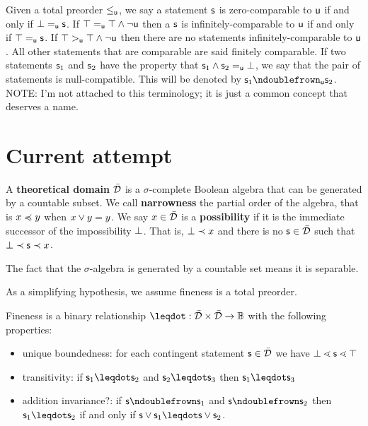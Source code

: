\documentclass{article}
\begin{document}
Given a total preorder $\leq_{\stmt[u]}$, we say a statement $\stmt$ is zero-comparable to $\stmt[u]$ if and only if $\impossibility =_{\stmt[u]} \stmt$. If $\certainty =_{\stmt[u]} \certainty \AND \NOT \stmt[u]$ then a $\stmt$ is infinitely-comparable to $\stmt[u]$ if and only if $\certainty =_{\stmt[u]} \stmt$. If $\certainty >_{\stmt[u]} \certainty \AND \NOT \stmt[u]$ then there are no statements infinitely-comparable to $\stmt[u]$. All other statements that are comparable are said finitely comparable. If two statements $\stmt_1$ and $\stmt_2$ have the property that $\stmt_1\AND\stmt_2\equ\impossibility$, we say that the pair of statements is null-compatible. This will be denoted by $\stmt_1\ncomp_{\stmt[u]}\stmt_2$. NOTE: I'm not attached to this terminology; it is just a common concept that deserves a name. 


\section{Current attempt}

\begin{defn}
    A \textbf{theoretical domain} $\tdomain$ is a $\sigma$-complete Boolean algebra that can be generated by a countable subset. We call \textbf{narrowness} the partial order of the algebra, that is $x \narrower y$ when $x \OR y = y$. We say $x \in \tdomain$ is a \textbf{possibility} if it is the immediate successor of the impossibility $\impossibility$. That is, $\impossibility \snarrower x$ and there is no $\stmt \in \tdomain$ such that $\impossibility \snarrower \stmt \snarrower x$.
\end{defn}

The fact that the $\sigma$-algebra is generated by a countable set means it is separable.

As a simplifying hypothesis, we assume fineness is a total preorder.

\begin{defn}\label{fineness}
	 Fineness is a binary relationship $\finer : \tdomain \times \tdomain \to \Bool$ with the following properties:
	\begin{itemize}
		\item unique boundedness: for each contingent statement $\stmt \in \tdomain$ we have $\impossibility \sfiner \stmt \sfiner \certainty$
		\item transitivity: if $\stmt_1 \finer \stmt_2$ and $\stmt_2 \finer \stmt_3$ then $\stmt_1 \finer \stmt_3$
		\item addition invariance?: if $\stmt \ncomp \stmt_1$ and $\stmt \ncomp \stmt_2$ then $\stmt_1 \finer \stmt_2$ if and only if $\stmt \OR \stmt_1 \finer \stmt \OR \stmt_2$.
	\end{itemize}
\end{defn}
\end{document}
